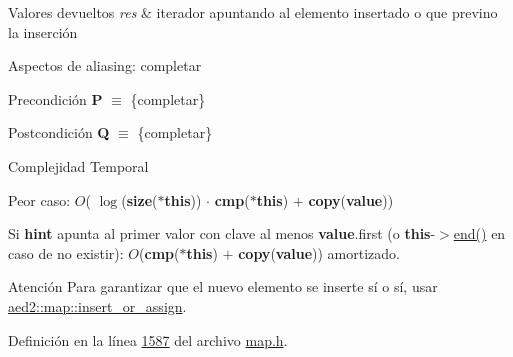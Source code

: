 \begin{DoxyRetVals}{Valores devueltos}
{\em res} & iterador apuntando al elemento insertado o que previno la inserción\\
\hline
\end{DoxyRetVals}
\begin{DoxyParagraph}{Aspectos de aliasing\+:}
completar
\end{DoxyParagraph}
\begin{DoxyPrecond}{Precondición}
{\bfseries P} $\equiv$ \{completar\} 
\end{DoxyPrecond}
\begin{DoxyPostcond}{Postcondición}
{\bfseries Q} $\equiv$ \{completar\}
\end{DoxyPostcond}

\begin{DoxyDescription}
\item[Complejidad Temporal]
\begin{DoxyItemize}
\item Peor caso\+: $O$( $\log$({\bfseries size}({\bfseries $\ast$this})) $\cdot$ {\bfseries cmp}({\bfseries $\ast$this}) $+$ {\bfseries copy}({\bfseries value}))
\item Si {\bfseries hint} apunta al primer valor con clave al menos {\bfseries value}.first (o {\bfseries this}-\/$>$\hyperlink{classaed2_1_1map_a76023e6a56cb625513e1b5ea028bf983_a76023e6a56cb625513e1b5ea028bf983}{end()} en caso de no existir)\+: $O$({\bfseries cmp}({\bfseries $\ast$this}) $+$ {\bfseries copy}({\bfseries value})) amortizado. 
\end{DoxyItemize}
\end{DoxyDescription}

\begin{DoxyAttention}{Atención}
Para garantizar que el nuevo elemento se inserte sí o sí, usar \hyperlink{classaed2_1_1map_a2ef6723c183916276b0afc4a4c721475_a2ef6723c183916276b0afc4a4c721475}{aed2\+::map\+::insert\+\_\+or\+\_\+assign}. 
\end{DoxyAttention}


Definición en la línea \hyperlink{map_8h_source_l01587}{1587} del archivo \hyperlink{map_8h_source}{map.\+h}.

\mbox{\label{classaed2_1_1map_a6941cde9a79c27f054b5c97a587a1854_a6941cde9a79c27f054b5c97a587a1854}} 
